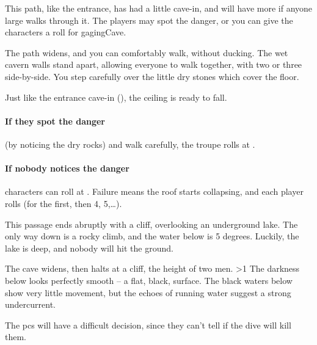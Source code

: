 \begin{multicols}{2}
This path, like the entrance, has had a little cave-in, and will have more if anyone large walks through it.
The players may spot the danger, or you can give the characters a roll for \gls{gagingCave}.

\begin{boxtext}
  The path widens, and you can comfortably walk, without ducking.
  The wet cavern walls stand apart, allowing everyone to walk together, with two or three side-by-side.
  You step carefully over the little dry stones which cover the floor.
\end{boxtext}

Just like the entrance cave-in (), the ceiling is ready to fall.

\paragraph{If they spot the danger}
(by noticing the dry rocks) and walk carefully, the troupe rolls  at \tn[7].

\paragraph{If nobody notices the danger}
characters can roll  at \tn[10].
Failure means the roof starts collapsing, and each player rolls  (\tn[3] for the first, then 4, 5,\ldots).




This passage ends abruptly with a cliff, overlooking an underground lake.
The only way down is a rocky climb, and the water below is 5 degrees.
Luckily, the lake is deep, and nobody will hit the ground.

\begin{boxtext}
  The cave widens, then halts at a cliff, the height of two men.
  \ifnum\value{temperature}>1%
    The darkness below looks perfectly smooth -- a flat, black, surface.
  \else%
    The black waters below show very little movement, but the echoes of running water suggest a strong undercurrent.
  \fi%
\end{boxtext}

The \glspl{pc} will have a difficult decision, since they can't tell if the dive will kill them.


\end{multicols}
